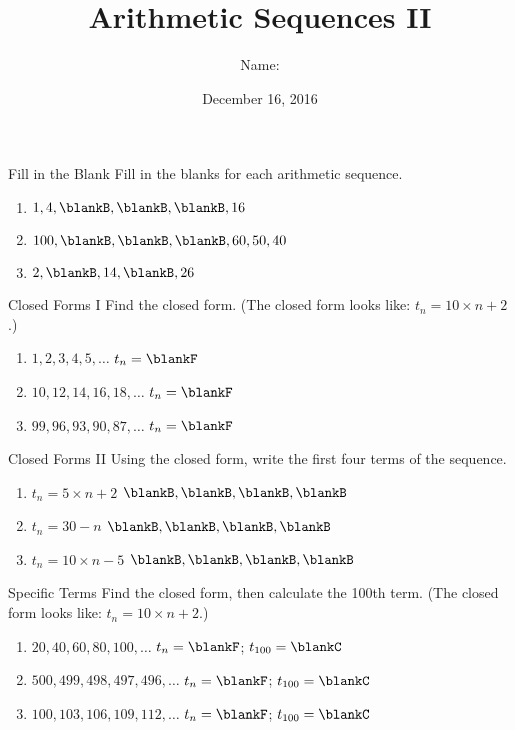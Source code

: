 \documentclass[12pt,letterpaper]{article}
\title{Arithmetic Sequences II}
\author{Name: \underline{\hspace{5cm}}}
\date{December 16, 2016}
\begin{document}
\maketitle

\thispagestyle{empty}

\begin{problem}{Fill in the Blank}
 Fill in the blanks for each arithmetic sequence.

\begin{enumerate}[\hspace{.5cm}a.]
\item \(1, 4, \blankB, \blankB, \blankB, 16\)
\item \(100, \blankB, \blankB, \blankB, 60, 50, 40\)
\item \(2, \blankB, 14, \blankB, 26\)
\end{enumerate}
\end{problem}

\begin{problem}{Closed Forms I}
 Find the closed form. (The closed form looks like: \(t_n = 10 \times n + 2\).)

\begin{enumerate}[\hspace{.5cm}a.]
\item $1, 2, 3, 4, 5, \ldots$ \hfill $t_n = \blankF$
\item $10, 12, 14, 16, 18, \ldots$ \hfill $t_n = \blankF$
\item $99, 96, 93, 90, 87, \ldots$ \hfill $t_n = \blankF$
\end{enumerate}
\end{problem}

\begin{problem}{Closed Forms II}
 Using the closed form, write the first four terms of the sequence.

\begin{enumerate}[\hspace{.5cm}a.]
\item $t_n = 5 \times n + 2$ \hfill
$\blankB, \blankB, \blankB, \blankB$
\item $t_n = 30 - n$ \hfill
$\blankB, \blankB, \blankB, \blankB$
\item $t_n = 10 \times n - 5$ \hfill
$\blankB, \blankB, \blankB, \blankB$
\end{enumerate}
\end{problem}

\begin{problem}{Specific Terms}
 Find the closed form, then calculate the 100th term. (The closed form looks
 like: $t_n = 10 \times n + 2$.)

\begin{enumerate}[\hspace{.5cm}a.]
\item $20, 40, 60, 80, 100, \ldots$ \hfill $t_n = \blankF$;
$t_{100} = \blankC$
\item $500, 499, 498, 497, 496, \ldots$ \hfill $t_n = \blankF$;
$t_{100} = \blankC$
\item $100, 103, 106, 109, 112, \ldots$ \hfill $t_n = \blankF$;
$t_{100} = \blankC$
\end{enumerate}
\end{problem}
\end{document}
